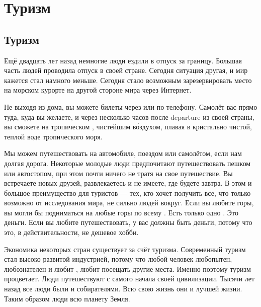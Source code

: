 \chapter{Туризм}

\section{Туризм}
Ещё двадцать лет назад немногие люди ездили в отпуск за границу. Большая часть людей проводила отпуск в своей стране. Сегодня ситуация другая, и мир кажется стал намного меньше. Сегодня стало возможным зарезервировать место на морском курорте на другой стороне мира через Интернет.

Не выходя из дома, вы можете  билеты через  или по телефону. Самолёт  вас прямо туда, куда вы желаете, и через несколько часов после  {departure} из своей страны, вы сможете  на тропическом ,  чистейшим в\'{о}здухом, плавая в кристально чистой, теплой воде тропического моря.

Мы можем путешествовать на автомобиле, поездом или самолётом, если нам  долгая дорога. Некоторые молодые люди предпочитают путешествовать пешком или автостопом, при этом почти ничего не тратя на свое путешествие. Вы встречаете новых друзей, развлекаетесь и  не имеете, где будете завтра. В этом и  большое преимущество для туристов --- тех, кто хочет получить все, что только возможно от исследования мира,  не сильно  людей вокруг. Если вы любите горы, вы могли бы подниматься на любые горы по всему . Есть только одно . Это деньги. Если вы любите путешествовать, у вас должны быть деньги, потому что это, в действительности, не дешевое хобби.

Экономика некоторых стран существует за счёт туризма. Современный туризм стал высоко развитой индустрией, потому что любой человек любопытен, любознателен и любит , любит посещать другие места. Именно поэтому туризм процветает.
Люди путешествуют с самого начала своей цивилизации. Тысячи лет назад все люди были  и собирателями. Всю свою жизнь они    и лучшей жизни. Таким образом люди  всю планету Земля.

